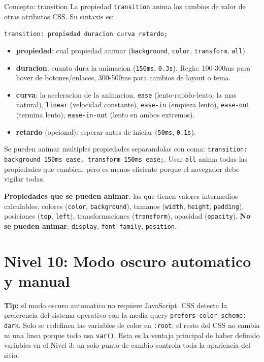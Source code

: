 \documentclass[11pt,a4paper]{article}
\begin{document}
	\begin{cajaconcepto}{Concepto: transition}
		La propiedad \texttt{transition} anima los cambios de valor de otras atributos CSS. Su sintaxis es:
		
		\texttt{transition: propiedad duracion curva retardo;}
		
		\begin{itemize}[leftmargin=1.2em,itemsep=3pt]
			\item \textbf{propiedad}: cual propiedad animar (\texttt{background}, \texttt{color}, \texttt{transform}, \texttt{all}).
			\item \textbf{duracion}: cuanto dura la animacion (\texttt{150ms}, \texttt{0.3s}). Regla: 100-300ms para hover de botones/enlaces, 300-500ms para cambios de layout o tema.
			\item \textbf{curva}: la aceleracion de la animacion. \texttt{ease} (lento-rapido-lento, la mas natural), \texttt{linear} (velocidad constante), \texttt{ease-in} (empieza lento), \texttt{ease-out} (termina lento), \texttt{ease-in-out} (lento en ambos extremos).
			\item \textbf{retardo} (opcional): esperar antes de iniciar (\texttt{50ms}, \texttt{0.1s}).
		\end{itemize}
		
		Se pueden animar multiples propiedades separandolas con coma: \texttt{transition: background 150ms ease, transform 150ms ease;}. Usar \texttt{all} anima todas las propiedades que cambien, pero es menos eficiente porque el navegador debe vigilar todas.
		
		\textbf{Propiedades que se pueden animar}: las que tienen valores intermedios calculables: colores (\texttt{color}, \texttt{background}), tamanos (\texttt{width}, \texttt{height}, \texttt{padding}), posiciones (\texttt{top}, \texttt{left}), transformaciones (\texttt{transform}), opacidad (\texttt{opacity}). \textbf{No se pueden animar}: \texttt{display}, \texttt{font-family}, \texttt{position}.
	\end{cajaconcepto}
	
	\section{Nivel 10: Modo oscuro automatico y manual}
	\textbf{Tip:} el modo oscuro automatico no requiere JavaScript. CSS detecta la preferencia del sistema operativo con la media query \texttt{prefers-color-scheme: dark}. Solo se redefinen las variables de color en \texttt{:root}; el resto del CSS no cambia ni una linea porque todo usa \texttt{var()}. Esta es la ventaja principal de haber definido variables en el Nivel 3: un solo punto de cambio controla toda la apariencia del sitio.
	
\end{document}
